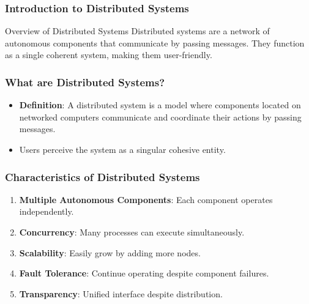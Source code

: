 \documentclass[aspectratio=169]{beamer}
\begin{document}
\begin{frame}[fragile]
    \frametitle{Introduction to Distributed Systems}
    \begin{block}{Overview of Distributed Systems}
        Distributed systems are a network of autonomous components that communicate by passing messages. They function as a single coherent system, making them user-friendly.
    \end{block}
\end{frame}

\begin{frame}[fragile]
    \frametitle{What are Distributed Systems?}
    \begin{itemize}
        \item \textbf{Definition}: A distributed system is a model where components located on networked computers communicate and coordinate their actions by passing messages.
        \item Users perceive the system as a singular cohesive entity.
    \end{itemize}
\end{frame}

\begin{frame}[fragile]
    \frametitle{Characteristics of Distributed Systems}
    \begin{enumerate}
        \item \textbf{Multiple Autonomous Components}: Each component operates independently.
        \item \textbf{Concurrency}: Many processes can execute simultaneously.
        \item \textbf{Scalability}: Easily grow by adding more nodes.
        \item \textbf{Fault Tolerance}: Continue operating despite component failures.
        \item \textbf{Transparency}: Unified interface despite distribution.
    \end{enumerate}
\end{frame}
\end{document}
